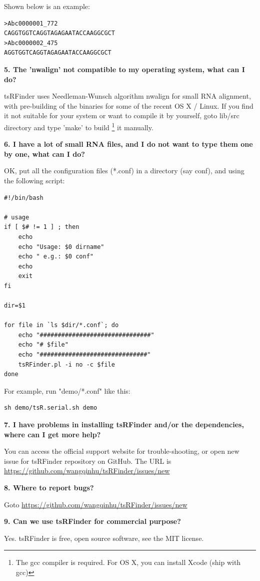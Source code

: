 \documentclass[11pt, a4paper]{article}
\begin{document}
Shown below is an example:

{\scriptsize \begin{tcolorbox}[colback=blue!5!white,colframe=pink!75!black,title=sRNA example]
\begin{verbatim}
>Abc0000001_772
CAGGTGGTCAGGTAGAGAATACCAAGGCGCT
>Abc0000002_475
AGGTGGTCAGGTAGAGAATACCAAGGCGCT
\end{verbatim}
\end{tcolorbox}}

\textbf{5. The 'nwalign' not compatible to my operating system, what can I do?}

tsRFinder uses Needleman-Wunsch algorithm nwalign for small RNA alignment, with pre-building of the binaries for some of the recent OS X / Linux. If you find it not suitable for your system or want to compile it by yourself, goto lib/src directory and type 'make' to build \footnote{The gcc compiler is required. For OS X, you can install Xcode (ship with gcc)} it manually.

\textbf{6. I have a lot of small RNA files, and I do not want to type them one by one, what can I do?}

OK, put all the configuration files (*.conf) in a directory (say conf), and using the following script:

{\scriptsize \begin{tcolorbox}[colback=blue!5!white,colframe=pink!75!black,title=demo/tsR.serial.sh]
\begin{verbatim}
#!/bin/bash

# usage
if [ $# != 1 ] ; then
	echo
	echo "Usage: $0 dirname"
	echo " e.g.: $0 conf"
	echo
	exit
fi

dir=$1

for file in `ls $dir/*.conf`; do
	echo "###############################"
	echo "# $file"
	echo "##############################"
	tsRFinder.pl -i no -c $file
done
\end{verbatim}
\end{tcolorbox}}

For example, run "demo/*.conf" like this:

{\scriptsize \begin{tcolorbox}[colback=blue!5!white,colframe=pink!75!black,title=running a serials of tsRFinder]
\begin{verbatim}
sh demo/tsR.serial.sh demo
\end{verbatim}
\end{tcolorbox}}

\textbf{7. I have problems in installing tsRFinder and/or the dependencies, where can I get more help?}

You can access the official support website for trouble-shooting, or open new issue for tsRFinder repository on GitHub. The URL is \url{https://github.com/wangqinhu/tsRFinder/issues/new}

\textbf{8. Where to report bugs?}

Goto \url{https://github.com/wangqinhu/tsRFinder/issues/new}

\textbf{9. Can we use tsRFinder for commercial purpose?}

Yes. tsRFinder is free, open source software, see the MIT license.
\end{document}
